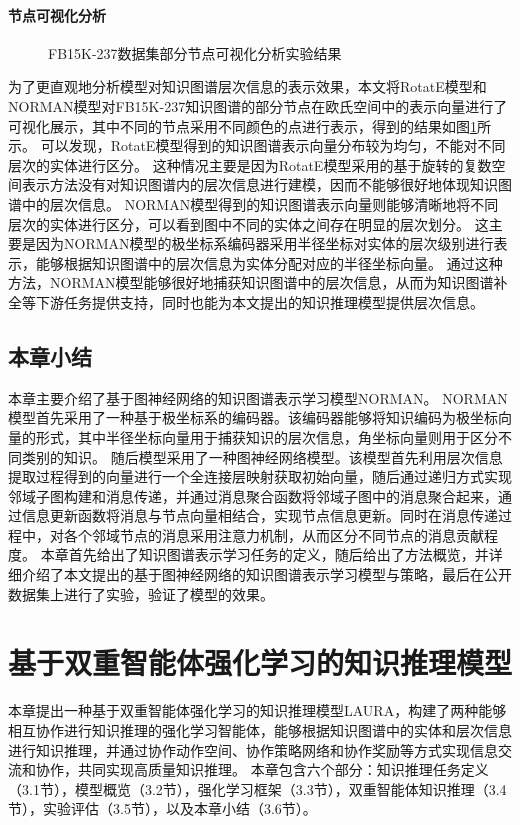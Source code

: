 \documentclass[algorithmlist, AutoFakeBold, AutoFakeSlant, figurelist, tablelist, nomlist, engineering]{seuthesix}
\begin{document}
\subsubsection{节点可视化分析}
\begin{figure}[t]
  \centering
  \caption{FB15K-237数据集部分节点可视化分析实验结果}
  \label{Experiment1_figures}
\end{figure}
为了更直观地分析模型对知识图谱层次信息的表示效果，本文将RotatE模型和NORMAN模型对FB15K-237知识图谱的部分节点在欧氏空间中的表示向量进行了可视化展示，其中不同的节点采用不同颜色的点进行表示，得到的结果如图\ref{Experiment1_figures}所示。
可以发现，RotatE模型得到的知识图谱表示向量分布较为均匀，不能对不同层次的实体进行区分。
这种情况主要是因为RotatE模型采用的基于旋转的复数空间表示方法没有对知识图谱内的层次信息进行建模，因而不能够很好地体现知识图谱中的层次信息。
NORMAN模型得到的知识图谱表示向量则能够清晰地将不同层次的实体进行区分，可以看到图中不同的实体之间存在明显的层次划分。
这主要是因为NORMAN模型的极坐标系编码器采用半径坐标对实体的层次级别进行表示，能够根据知识图谱中的层次信息为实体分配对应的半径坐标向量。
通过这种方法，NORMAN模型能够很好地捕获知识图谱中的层次信息，从而为知识图谱补全等下游任务提供支持，同时也能为本文提出的知识推理模型提供层次信息。

\section{本章小结}
本章主要介绍了基于图神经网络的知识图谱表示学习模型NORMAN。
NORMAN模型首先采用了一种基于极坐标系的编码器。该编码器能够将知识编码为极坐标向量的形式，其中半径坐标向量用于捕获知识的层次信息，角坐标向量则用于区分不同类别的知识。
随后模型采用了一种图神经网络模型。该模型首先利用层次信息提取过程得到的向量进行一个全连接层映射获取初始向量，随后通过递归方式实现邻域子图构建和消息传递，并通过消息聚合函数将邻域子图中的消息聚合起来，通过信息更新函数将消息与节点向量相结合，实现节点信息更新。同时在消息传递过程中，对各个邻域节点的消息采用注意力机制，从而区分不同节点的消息贡献程度。
本章首先给出了知识图谱表示学习任务的定义，随后给出了方法概览，并详细介绍了本文提出的基于图神经网络的知识图谱表示学习模型与策略，最后在公开数据集上进行了实验，验证了模型的效果。


\chapter{基于双重智能体强化学习的知识推理模型}
本章提出一种基于双重智能体强化学习的知识推理模型LAURA，构建了两种能够相互协作进行知识推理的强化学习智能体，能够根据知识图谱中的实体和层次信息进行知识推理，并通过协作动作空间、协作策略网络和协作奖励等方式实现信息交流和协作，共同实现高质量知识推理。
本章包含六个部分：知识推理任务定义（3.1节），模型概览（3.2节），强化学习框架（3.3节），双重智能体知识推理（3.4节），实验评估（3.5节），以及本章小结（3.6节）。
\end{document}

